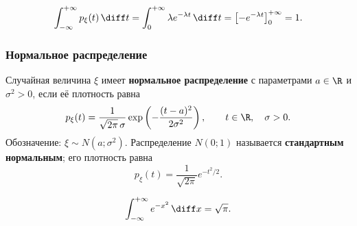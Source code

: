 \[
    \int_{-\infty}^{+\infty}p_\xi(t)\,\diff t
    =\int_0^{+\infty}\lambda e^{-\lambda t}\,\diff t
    =\left[-e^{-\lambda t}\right]_0^{+\infty}=1.
\]

\begin{center}
\end{center}

\subsubsection{Нормальное распределение}

\begin{definition}
    Случайная величина $\xi$ имеет \textbf{нормальное распределение}
    с параметрами $a\in\R$ и $\sigma^2>0$, если её плотность равна
    \[
        p_\xi(t)=\frac{1}{\sqrt{2\pi}\,\sigma}
        \exp\left(-\frac{(t-a)^2}{2\sigma^2}\right),
        \qquad t\in\R,\quad\sigma>0.
    \]
    Обозначение: $\xi\sim N(a;\sigma^2)$.
    Распределение $N(0;1)$ называется \textbf{стандартным нормальным};
    его плотность равна
    \[
        p_\xi(t)=\frac{1}{\sqrt{2\pi}}e^{-t^2/2}.
    \]
\end{definition}

\newpage
\begin{lemma}
    \[
        \int_{-\infty}^{+\infty}e^{-x^2}\,\diff x=\sqrt\pi.
    \]
\end{lemma}

